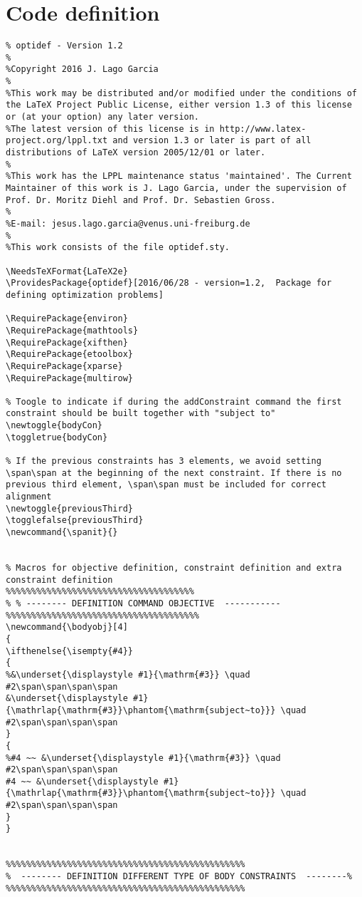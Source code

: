 \documentclass[]{report}
\begin{document}
\section{Code definition}
\begin{lstlisting}
% optidef - Version 1.2
%
%Copyright 2016 J. Lago Garcia
%
%This work may be distributed and/or modified under the conditions of the LaTeX Project Public License, either version 1.3 of this license or (at your option) any later version.
%The latest version of this license is in http://www.latex-project.org/lppl.txt and version 1.3 or later is part of all distributions of LaTeX version 2005/12/01 or later.
%
%This work has the LPPL maintenance status 'maintained'. The Current Maintainer of this work is J. Lago Garcia, under the supervision of Prof. Dr. Moritz Diehl and Prof. Dr. Sebastien Gross.
%
%E-mail: jesus.lago.garcia@venus.uni-freiburg.de
%
%This work consists of the file optidef.sty.

\NeedsTeXFormat{LaTeX2e}
\ProvidesPackage{optidef}[2016/06/28 - version=1.2,  Package for defining optimization problems]

\RequirePackage{environ}
\RequirePackage{mathtools}	
\RequirePackage{xifthen}	
\RequirePackage{etoolbox}	
\RequirePackage{xparse}	
\RequirePackage{multirow}	

% Toogle to indicate if during the addConstraint command the first constraint should be built together with "subject to"
\newtoggle{bodyCon}
\toggletrue{bodyCon}

% If the previous constraints has 3 elements, we avoid setting \span\span at the beginning of the next constraint. If there is no previous third element, \span\span must be included for correct alignment
\newtoggle{previousThird}
\togglefalse{previousThird}
\newcommand{\spanit}{}


% Macros for objective definition, constraint definition and extra constraint definition
%%%%%%%%%%%%%%%%%%%%%%%%%%%%%%%%%%%%%
% % -------- DEFINITION COMMAND OBJECTIVE  -----------
%%%%%%%%%%%%%%%%%%%%%%%%%%%%%%%%%%%%%%
\newcommand{\bodyobj}[4]
{
\ifthenelse{\isempty{#4}}
{
%&\underset{\displaystyle #1}{\mathrm{#3}} \quad #2\span\span\span\span
&\underset{\displaystyle #1}{\mathrlap{\mathrm{#3}}\phantom{\mathrm{subject~to}}} \quad #2\span\span\span\span
}
{
%#4 ~~ &\underset{\displaystyle #1}{\mathrm{#3}} \quad #2\span\span\span\span
#4 ~~ &\underset{\displaystyle #1}{\mathrlap{\mathrm{#3}}\phantom{\mathrm{subject~to}}} \quad #2\span\span\span\span
}
}


%%%%%%%%%%%%%%%%%%%%%%%%%%%%%%%%%%%%%%%%%%%%%%%
%  -------- DEFINITION DIFFERENT TYPE OF BODY CONSTRAINTS  --------%
%%%%%%%%%%%%%%%%%%%%%%%%%%%%%%%%%%%%%%%%%%%%%%%


\end{lstlisting}
\end{document}
